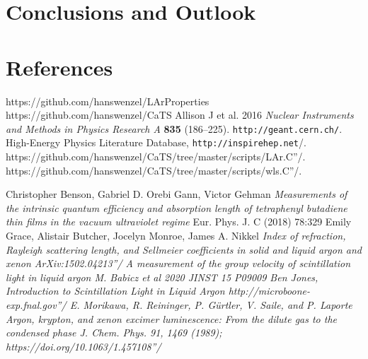 \documentclass[a4paper]{jpconf}
\begin{document}
\section{Conclusions and Outlook}

 \section*{References}

 \begin{thebibliography}{99}
   https://github.com/hanswenzel/LArProperties
   https://github.com/hanswenzel/CaTS
 Allison J et al. 2016 {\it Nuclear Instruments and Methods in Physics
                Research A} {\bf 835} (186--225).
 \verb|http://geant.cern.ch/|.
 High-Energy Physics Literature Database,
  \verb"http://inspirehep.net"/.
  \verb''https://github.com/hanswenzel/CaTS/tree/master/scripts/LAr.C''/.
  \verb''https://github.com/hanswenzel/CaTS/tree/master/scripts/wls.C''/.

 Christopher Benson, Gabriel D. Orebi Gann, Victor Gehman
  {\it Measurements of the intrinsic quantum efficiency and absorption
      length of tetraphenyl butadiene thin films in the vacuum
      ultraviolet regime}
Eur. Phys. J. C (2018) 78:329
Emily Grace, Alistair Butcher, Jocelyn Monroe, James A. Nikkel
  \it{Index of refraction, Rayleigh scattering length, and Sellmeier coefficients in solid and liquid argon and xenon}
  \verb'' ArXiv:1502.04213''/
  \it{A measurement of the group velocity of scintillation light in liquid argon}
  M. Babicz et al 2020 JINST 15 P09009
  Ben Jones, \it{Introduction to Scintillation Light in Liquid Argon}
  \verb''http://microboone-exp.fnal.gov''/
  E. Morikawa, R. Reininger, P. Gürtler, V. Saile, and P. Laporte
\it{Argon, krypton, and xenon excimer luminescence: From the dilute gas to the
condensed phase}
J. Chem. Phys. 91, 1469 (1989);
  \verb''https://doi.org/10.1063/1.457108''/


  
\end{thebibliography}
\end{document}
